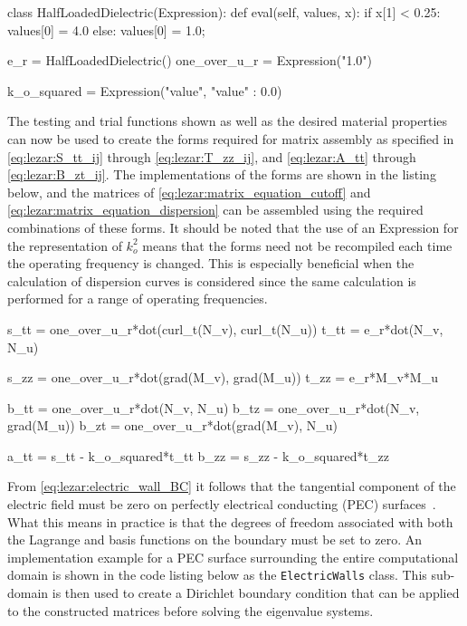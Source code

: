 \begin{python}
class HalfLoadedDielectric(Expression):
    def eval(self, values, x):
        if x[1] < 0.25:
            values[0] = 4.0
        else:
            values[0] = 1.0;

e_r = HalfLoadedDielectric()
one_over_u_r = Expression("1.0")

k_o_squared = Expression("value", {"value" : 0.0})
\end{python}

The testing and trial functions shown as well as the desired material properties can now be used to create the forms required for matrix assembly as specified in \eqref{eq:lezar:S_tt_ij} through \eqref{eq:lezar:T_zz_ij}, and \eqref{eq:lezar:A_tt} through \eqref{eq:lezar:B_zt_ij}. The implementations of the forms are shown in the listing below, and the matrices of \eqref{eq:lezar:matrix_equation_cutoff} and \eqref{eq:lezar:matrix_equation_dispersion} can be assembled using the required combinations of these forms. It should be noted that the use of an Expression for the representation of $k_o^2$ means that the forms need not be recompiled each time the operating frequency is changed. This is especially beneficial when the calculation of dispersion curves is considered since the same calculation is performed for a range of operating frequencies.

\begin{python}
s_tt = one_over_u_r*dot(curl_t(N_v), curl_t(N_u))
t_tt = e_r*dot(N_v, N_u)

s_zz = one_over_u_r*dot(grad(M_v), grad(M_u))
t_zz = e_r*M_v*M_u

b_tt = one_over_u_r*dot(N_v, N_u)
b_tz = one_over_u_r*dot(N_v, grad(M_u))
b_zt = one_over_u_r*dot(grad(M_v), N_u)

a_tt = s_tt - k_o_squared*t_tt
b_zz = s_zz - k_o_squared*t_zz
\end{python}

From \eqref{eq:lezar:electric_wall_BC} it follows that the tangential component of the electric field must be zero on perfectly electrical conducting (PEC) surfaces~\citep{Smith1997}. What this means in practice is that the degrees of freedom associated with both the Lagrange and \nedelec{} basis functions on the boundary must be set to zero. An implementation example for a PEC surface surrounding the entire computational domain is shown in the code listing below as the {\tt ElectricWalls} class. This sub-domain is then used to create a Dirichlet boundary condition that can be applied to the constructed matrices before solving the eigenvalue systems.

